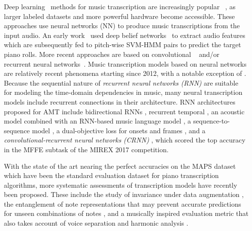 

Deep learning~\cite{lecun2015deeplearning} methods for music transcription are increasingly popular%
~\cite{benetos2019amt}, as larger labeled datasets and more powerful hardware become accessible.
These approaches use neural networks (NN) to produce music transcriptions from the input audio.
An early work~\cite{nam2011classification} used deep belief networks~\cite{hinton2006dbn} to extract audio features which are subsequently fed to pitch-wise SVM-HMM pairs to predict the target piano rolls.
More recent approaches are based on convolutional%
~\cite{bittner2017deepsalience,kelz2016framewise} and/or recurrent neural networks~\cite{bock2012rnn,sigtia2016endtoend,hawthorne2018onsetsframes}.
Music transcription models based on neural networks are relatively recent phenomena starting since 2012, with a notable exception of .
Because the sequential nature of \textit{recurrent neural networks (RNN)} are suitable for modeling the time-domain dependencies in music, many neural transcription models include recurrent connections in their architecture.
RNN architectures proposed for AMT include bidirectional RNNs \cite{bock2012rnn}, recurrent temporal  \cite{boulangerlewandowski2012temporal}, an acoustic model combined with an RNN-based music language model \cite{sigtia2015hybrid,sigtia2016endtoend},
a sequence-to-sequence model \cite{ullrich2017seq2seq},
a dual-objective loss for onsets and frames \cite{hawthorne2018onsetsframes},
and a \textit{convolutional-recurrent neural networks (CRNN)} \cite{thome2017crnn}, which scored the top accuracy in the MFFE subtask of the MIREX 2017 competition.




With the state of the art nearing the perfect accuracies \cite{ewert2017admm} on the MAPS dataset \cite{emiya2010smoothness} which have been the standard evaluation dataset for piano transcription algorithms, more systematic assessments of transcription models have recently been proposed.
These include the study of invariance under data augmentation \cite{thickstun2017invariances}, the entanglement of note representations that may prevent accurate predictions for unseen combinations of notes \cite{kelz2017entanglement}, and a musically inspired evaluation metric that also takes account of voice separation and harmonic analysis \cite{mcleod2018eval}.


